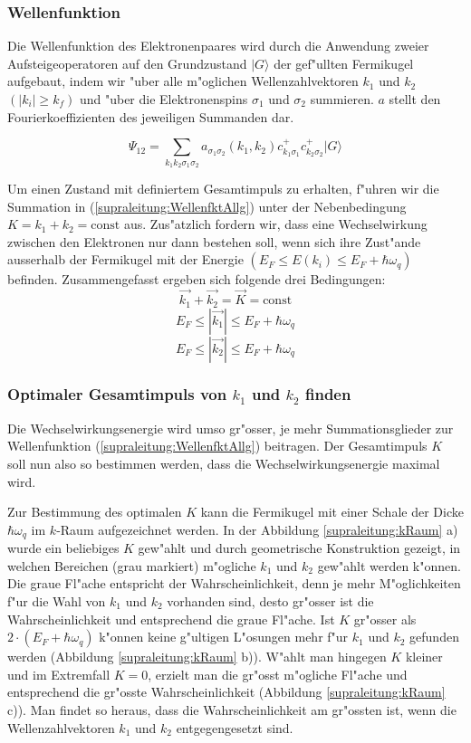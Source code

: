 \begin{refsection}
\subsubsection{Wellenfunktion}
Die Wellenfunktion des Elektronenpaares wird durch die Anwendung zweier Aufsteigeoperatoren
auf den Grundzustand $|G\rangle$ der gef"ullten Fermikugel aufgebaut, indem wir "uber
alle m"oglichen Wellenzahlvektoren $k_1$ und $k_2$ $(|k_i| \ge k_f)$ und "uber
die Elektronenspins $\sigma_1$ und $\sigma_2$ summieren.
$a$ stellt den Fourierkoeffizienten des jeweiligen Summanden dar.

\begin{equation}
\Psi_{12}=\sum \limits_{k_1k_2\sigma_1\sigma_2} a_{\sigma_1\sigma_2}
(k_1,k_2)c^+_{k_1\sigma_1}c^+_{k_2\sigma_2}|G\rangle
\label{supraleitung:WellenfktAllg}
\end{equation}

Um einen Zustand mit definiertem Gesamtimpuls zu erhalten, f"uhren wir die Summation in
(\ref{supraleitung:WellenfktAllg}) unter der Nebenbedingung $K=k_1+k_2=\text{const}$ aus.
Zus"atzlich fordern wir, dass eine Wechselwirkung zwischen den Elektronen nur dann bestehen soll,
wenn sich ihre Zust"ande ausserhalb der Fermikugel mit der Energie
$(E_F \le E(k_i) \le E_F+\hbar\omega_q)$ befinden.
Zusammengefasst ergeben sich folgende drei Bedingungen:
\[
\overrightarrow{k_1}+\overrightarrow{k_2}=\overrightarrow{K}=\text{const}
\]
\[
E_F\le|\overrightarrow{k_1}|\le E_F+\hbar\omega_q
\]
\[
E_F\le|\overrightarrow{k_2}|\le E_F+\hbar\omega_q
\]
\subsubsection{Optimaler Gesamtimpuls von $k_1$ und $k_2$ finden}

Die Wechselwirkungsenergie wird umso gr"osser, je mehr Summationsglieder zur Wellenfunktion
(\ref{supraleitung:WellenfktAllg}) beitragen.
Der Gesamtimpuls $K$ soll nun also so bestimmen werden, dass die Wechselwirkungsenergie maximal wird.

Zur Bestimmung des optimalen $K$ kann die Fermikugel mit einer Schale der Dicke
$\hbar\omega_q$ im $k$-Raum aufgezeichnet werden.
In der Abbildung \ref{supraleitung:kRaum} a) wurde ein beliebiges $K$ gew"ahlt und durch
geometrische Konstruktion gezeigt, in welchen Bereichen (grau markiert) m"ogliche $k_1$ und $k_2$
gew"ahlt werden k"onnen.
Die graue Fl"ache entspricht der Wahrscheinlichkeit, denn je mehr M"oglichkeiten f"ur die Wahl
von $k_1$ und $k_2$ vorhanden sind, desto gr"osser ist die Wahrscheinlichkeit und entsprechend
die graue Fl"ache.
Ist $K$ gr"osser als $2\cdot(E_F+\hbar\omega_q)$ k"onnen keine g"ultigen L"osungen mehr
f"ur $k_1$ und $k_2$ gefunden werden (Abbildung \ref{supraleitung:kRaum} b)).
W"ahlt man hingegen $K$ kleiner und im Extremfall $K=0$, erzielt man die gr"osst m"ogliche
Fl"ache und entsprechend die gr"osste Wahrscheinlichkeit (Abbildung \ref{supraleitung:kRaum} c)).
Man findet so heraus, dass die Wahrscheinlichkeit am gr"ossten ist, wenn die
Wellenzahlvektoren $k_1$ und $k_2$ entgegengesetzt sind.


\end{refsection}

